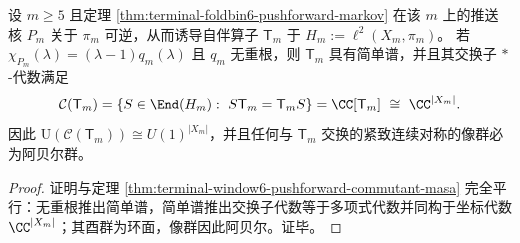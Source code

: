 \begin{corollary}[谱满对称性 \texorpdfstring{$\Rightarrow$}{=>} 推送中心化子的环面化]\label{cor:terminal-window-pushforward-commutant-torus}
设 \(m\ge 5\) 且定理 \ref{thm:terminal-foldbin6-pushforward-markov} 在该 \(m\) 上的推送核 \(P_m\) 关于 \(\pi_m\) 可逆，从而诱导自伴算子 \(\mathsf{T}_m\) 于 \(H_m:=\ell^2(X_m,\pi_m)\)。
若 \(\chi_{P_m}(\lambda)=(\lambda-1)q_m(\lambda)\) 且 \(q_m\) 无重根，则 \(\mathsf{T}_m\) 具有简单谱，并且其交换子 \(*\)-代数满足
\[
\mathcal C(\mathsf{T}_m)
=\{S\in\End(H_m):\ S\mathsf{T}_m=\mathsf{T}_m S\}
=\CC[\mathsf{T}_m]
\ \cong\ \CC^{|X_m|}.
\]
因此 \(\mathrm U(\mathcal C(\mathsf{T}_m))\cong U(1)^{|X_m|}\)，并且任何与 \(\mathsf{T}_m\) 交换的紧致连续对称的像群必为阿贝尔群。
\end{corollary}
\begin{proof}
证明与定理 \ref{thm:terminal-window6-pushforward-commutant-masa} 完全平行：无重根推出简单谱，简单谱推出交换子代数等于多项式代数并同构于坐标代数 \(\CC^{|X_m|}\)；其酉群为环面，像群因此阿贝尔。证毕。
\end{proof}
